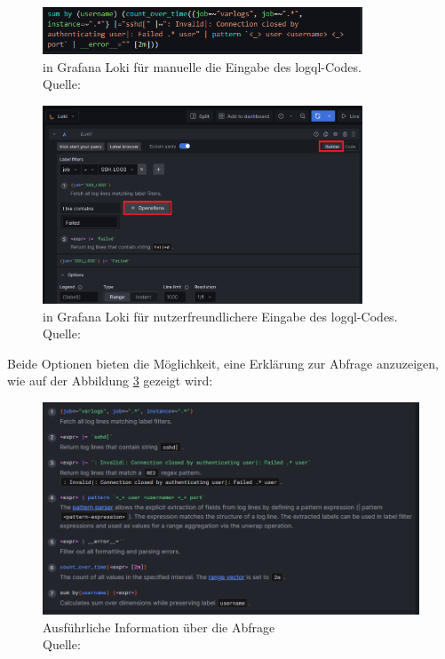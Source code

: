 \begin{figure}[H]
   \centering
   \includegraphics[width=0.85\textwidth]{assets/manuellerCodeLoki.png}
   \caption[ in Grafana Loki für manuelle die Eingabe des \gls{logql}-Codes]
   { in Grafana Loki für manuelle die Eingabe des \gls{logql}-Codes. \\ Quelle: \citep{VoidQuark_sshlogs}}
   \label{fig:Loki_Code}
   \centering
\end{figure}

\begin{figure}[H]
   \centering
   \includegraphics[width=0.85\textwidth]{assets/klickibuntyGrafana.png}
   \caption[ in Grafana Loki für nutzerfreundlichere Eingabe des \gls{logql}-Codes.]
   { in Grafana Loki für nutzerfreundlichere Eingabe des \gls{logql}-Codes. Quelle: \citep{VoidQuark_sshlogs}}
   \label{fig:Loki_Builder}
   \centering
\end{figure}

\newpage
Beide Optionen bieten die Möglichkeit, eine Erklärung zur Abfrage anzuzeigen, wie auf der Abbildung \ref{fig:Loki_CodeInformation} gezeigt wird:
\begin{figure}[H]
   \centering
   \includegraphics[width=1\textwidth]{assets/erklaerungLoki.png}
   \caption[Ausführliche Information über die Abfrage]
   {Ausführliche Information über die Abfrage\\Quelle: \citep{Grafana_QueryEditor}}
   \label{fig:Loki_CodeInformation}
   \centering
\end{figure}

